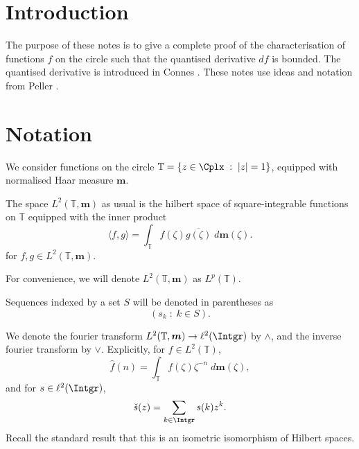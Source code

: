 \documentclass{unswmaths}
\begin{document}
\subject{}
\author{}
\title{}
\studentno{}


\newcommand{\Real}{\operatorname{Re}}
\newcommand{\Img}{\operatorname{Im}}
\newcommand{\lan}{\langle}
\newcommand{\ran}{\rangle}
\newcommand{\Proj}{\mathbb{P}}
\newcommand{\isom}{\cong}
\newcommand{\id}{{\operatorname{id}}}
\newcommand{\ha}{\boldsymbol{m}}
\newcommand{\Circ}{\mathbb{T}}
\newcommand{\BMO}{{BMO}}
\newcommand{\sgn}{\operatorname{sgn}}
\newcommand{\Diff}{\mathcal{D}}

\section*{Introduction}
The purpose of these notes is to give a complete proof of the characterisation of functions
$f$ on the circle such that the quantised derivative $df$ is bounded. The quantised derivative
is introduced in Connes \cite{connes94}. These notes use ideas and notation from Peller \cite{peller}.

\section*{Notation} 
We consider functions on the circle $\Circ = \{z \in \Cplx\;:\;|z| = 1\}$, equipped
with normalised Haar measure $\ha$.

The space $L^2(\Circ,\ha)$ as usual is the hilbert space of square-integrable functions
on $\Circ$ equipped with the inner product
\begin{equation*}
    \langle f,g\rangle = \int_{\Circ} f(\zeta)\overline{g(\zeta)}\;d\ha(\zeta).
\end{equation*}
for $f,g \in L^2(\Circ, \ha)$.

For convenience, we will denote $L^2(\Circ,\ha)$ as $L^p(\Circ)$.


Sequences indexed by a set $S$ will be denoted in parentheses as
\begin{equation*}
    (s_k\;:\;k \in S).
\end{equation*}

We denote the fourier transform $L^2(\Circ,\ha) \rightarrow \ell^2(\Intgr)$ 
by $\wedge$, and the inverse fourier transform by $\vee$. Explicitly,
for $f \in L^2(\Circ)$, 
\begin{equation*}
    \hat{f}(n) = \int_{\Circ} f(\zeta)\zeta^{-n}\;d\ha(\zeta),
\end{equation*}
and for $s \in \ell^2(\Intgr)$,
\begin{equation*}
    \check{s}(z) = \sum_{k \in \Intgr} s(k)z^k.
\end{equation*}
Recall the standard result that this is an isometric isomorphism of Hilbert spaces.
\end{document}
